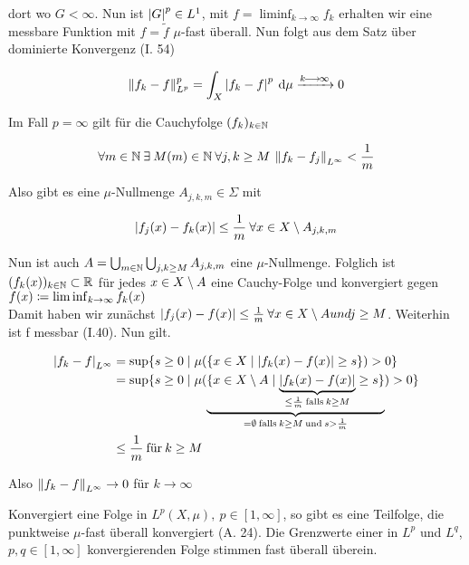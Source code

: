 \documentclass[skript.tex]{subfiles}
\begin{document}
\begin{bem*}
	dort wo $G< \infty$. Nun ist $\left| G \right|^p \in L^1$, mit $f = \liminf_{k \to \infty} f_k$ erhalten wir eine messbare Funktion mit $f = \tilde f$ $\mu$-fast überall. Nun folgt aus dem Satz über dominierte Konvergenz (I. 54)
	
	\begin{equation*}
	\left\lVert f_k - f \right\rVert_{L^p}^p = \int_X \left| f_k -f \right|^p \: \mathrm{d} \mu \xrightarrow{k\kern -1pt \longrightarrow \kern -1pt\infty} 0
	\end{equation*}
	
	Im Fall $p= \infty$ gilt für die Cauchyfolge $(f_k)_{k\in\mathbb{N}}$ 
	
	\begin{equation*}
	\forall m \in \mathbb{N} \: \exists \: M(m) \in \mathbb{N} \: \forall j,k \geq M \: \left\lVert f_k - f_j \right\rVert_{L^\infty} < \frac{1}{m}
	\end{equation*}
	
	Also gibt es eine $\mu$-Nullmenge $A_{j,k,m} \in \Sigma$ mit
	
	\begin{equation*}
	\left| f_j(x)- f_k(x) \right| \leq \frac{1}{m} \: \forall x \in X \setminus A_{j,k,m}
	\end{equation*}
	
	Nun ist auch $A = \bigcup_{m\in\mathbb{N}} \bigcup_{j,k \geq M} A_{j,k,m}$ eine $\mu$-Nullmenge.
	Folglich ist $ (f_k(x))_{k\in\mathbb{N}} \subset \mathbb{R}$ für jedes $ x \in X \setminus A$ eine Cauchy-Folge und konvergiert gegen $f(x) \coloneqq \liminf_{k\to\infty} f_k(x)$ \\
	Damit haben wir zunächst $\left| f_j(x) - f(x) \right| \leq \frac{1}{m} \: \forall x \in X \setminus A und j \geq M$. Weiterhin ist f messbar (I.40). Nun gilt.
	
	\begin{align*}
	\left| f_k-f \right|_{L^\infty} &= \sup\{s \geq 0 \mid \mu(\{x\in X \mid \left| f_k(x) - f(x) \right| \geq s \})>0\} \\
	&= \sup\{s \geq 0 \mid \mu( \underbrace{\{x\in X \setminus A \mid \underbrace{\left| f_k(x) - f(x) \right|}_{\leq \frac{1}{m} \: \text{falls} \: k\geq M}  \geq s \}}_{= \emptyset \: \text{falls} \: k\geq M \: \text{und} \: s > \frac{1}{m}})>0\} \\
	&\leq \frac{1}{m} \: \text{für} \: k \geq M
	\end{align*}
	
	Also $\left\lVert f_k - f \right\rVert_{L^\infty} \to 0$ für $ k \to \infty $
\end{bem*}

\begin{cor}
	Konvergiert eine Folge in $L^p(X,\mu), \: p \in [ 1,\infty]$, so gibt es eine Teilfolge, die punktweise $\mu$-fast überall konvergiert (A. 24). Die Grenzwerte einer in $L^p$ und $L^q$, $p,q \in [1,\infty]$ konvergierenden Folge stimmen fast überall überein.
\end{cor}
\end{document}
